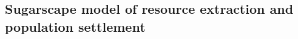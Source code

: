 \documentclass[Afour,sageh,times]{sagej}
\begin{document}


\subsection{Sugarscape model of resource extraction and population settlement}
\end{document}
